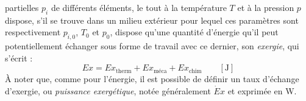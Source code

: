 \documentclass[a4paper,11pt]{scrartcl}
\begin{document}
partielles $p_i$ de différents éléments, le tout à la température $T$ et à la
pression $p$ dispose, s'il se trouve dans un milieu extérieur pour lequel ces
paramètres sont respectivement $p_{i,0}$, $T_0$ et $p_0$, dispose qu'une
quantité d'énergie qu'il peut potentiellement échanger sous forme de travail
avec ce dernier, son \emph{exergie}, qui s'écrit : \begin{equation}
	Ex = Ex_{\text{therm}} + Ex_{\text{méca}} + Ex_{\text{chim}} \qquad
	[\mathrm{J}]
\end{equation} À noter que, comme pour l'énergie, il est possible de définir un
taux d'échange d'exergie, ou \emph{puissance exergétique}, notée généralement
$\dot{E}x$ et exprimée en W.

\end{document}

